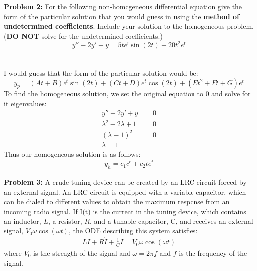 \documentclass[12pt]{article}
\begin{document}
\newpage 

\noindent \textbf{Problem 2: }For the following non-homogeneous differential equation give the form of the particular solution that you would guess in using the \textbf{method of undetermined coefficients}. Include your solution to the homogeneous problem. (\textbf{DO NOT} solve for the undetermined coefficients.)
	$$
	y'' - 2y' + y = 5te^{t}\sin(2t) + 20t^2e^{t}
	$$
\\ \\	

\noindent I would guess that the form of the particular solution would be:
	$$
	y_p = (At + B)e^{t}\sin(2t) + (Ct + D)e^{t}\cos(2t) + (Et^2 + Ft + G)e^t
	$$
To find the homogeneous solution, we set the original equation to 0 and solve for it eigenvalues:
	\begin{align*}
		y'' - 2y' + y &= 0 \\
		\lambda ^2 - 2\lambda + 1 &= 0 \\
		(\lambda - 1)^2 &= 0 \\
		\lambda = 1
	\end{align*}
Thus our homogeneous solution is as follows:
	\begin{align*}
		y_h = c_1e^{t} + c_2te^{t}
	\end{align*}

\newpage 

\noindent \textbf{Problem 3: }A crude tuning device can be created by an LRC-circuit forced by an external signal. An LRC-circuit is equipped with a variable capacitor, which can be dialed to different values to obtain the maximum response from an incoming radio signal. If I(t) is the current in the tuning device, which contains an inductor, $L$, a resistor, $R$, and a tunable capacitor, C, and receives an external signal, $V_0\omega \cos(\omega t)$, the ODE describing this system satisfies:
	\begin{align}
		L\ddot{I} + R\dot{I} + \frac{1}{C}I = V_0\omega \cos(\omega t)
	\end{align}
where $V_0$ is the strength of the signal and $\omega = 2 \pi f$ and $f$ is the frequency of the signal. 
\\ 
\end{document}
